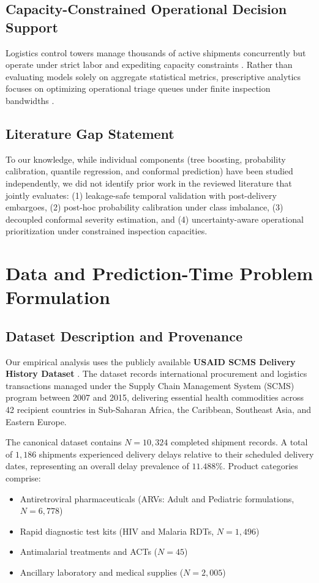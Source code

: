\documentclass[11pt,a4paper]{article}
\begin{document}
\subsection{Capacity-Constrained Operational Decision Support}
Logistics control towers manage thousands of active shipments concurrently but operate under strict labor and expediting capacity constraints \cite{bastani2021efficient, bertsimas2020predictive}. Rather than evaluating models solely on aggregate statistical metrics, prescriptive analytics focuses on optimizing operational triage queues under finite inspection bandwidths \cite{bastani2021efficient, simchilevi2014superstorms}.

\subsection{Literature Gap Statement}
To our knowledge, while individual components (tree boosting, probability calibration, quantile regression, and conformal prediction) have been studied independently, we did not identify prior work in the reviewed literature that jointly evaluates: (1) leakage-safe temporal validation with post-delivery embargoes, (2) post-hoc probability calibration under class imbalance, (3) decoupled conformal severity estimation, and (4) uncertainty-aware operational prioritization under constrained inspection capacities.

\section{Data and Prediction-Time Problem Formulation}
\subsection{Dataset Description and Provenance}
Our empirical analysis uses the publicly available \textbf{USAID SCMS Delivery History Dataset} \cite{usaid2015scms, scmsdataset2016}. The dataset records international procurement and logistics transactions managed under the Supply Chain Management System (SCMS) program between 2007 and 2015, delivering essential health commodities across 42 recipient countries in Sub-Saharan Africa, the Caribbean, Southeast Asia, and Eastern Europe.

The canonical dataset contains $N = 10,324$ completed shipment records. A total of $1,186$ shipments experienced delivery delays relative to their scheduled delivery dates, representing an overall delay prevalence of $11.488\%$. Product categories comprise:
\begin{itemize}
    \item Antiretroviral pharmaceuticals (ARVs: Adult and Pediatric formulations, $N = 6,778$)
    \item Rapid diagnostic test kits (HIV and Malaria RDTs, $N = 1,496$)
    \item Antimalarial treatments and ACTs ($N = 45$)
    \item Ancillary laboratory and medical supplies ($N = 2,005$)
\end{itemize}
\end{document}
